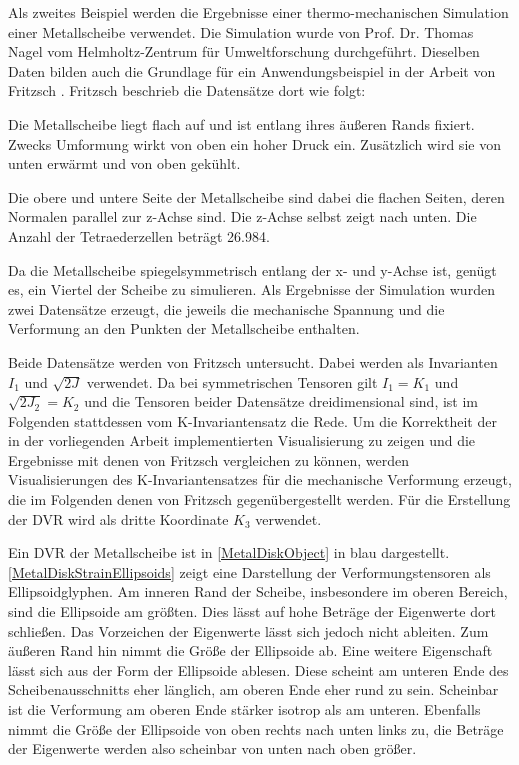 \documentclass[a4paper,fontsize=12pt,toc=bib,parskip=half,ngerman]{scrartcl}
\begin{document}
Als zweites Beispiel werden die Ergebnisse einer thermo-mechanischen Simulation einer Metallscheibe verwendet. Die Simulation wurde von Prof. Dr. Thomas Nagel vom Helmholtz-Zentrum f\"ur Umweltforschung durchgef\"uhrt. Dieselben Daten bilden auch die Grundlage f\"ur ein Anwendungsbeispiel in der Arbeit von Fritzsch \cite[S.15,~45~ ff.]{fritzsch2016continuousScatterplot}. Fritzsch beschrieb die Datens\"atze dort wie folgt:

\glqq Die Metallscheibe liegt flach auf und ist entlang ihres \"au{\ss}eren Rands fixiert. Zwecks Umformung wirkt von oben ein hoher Druck ein. Zus\"atzlich wird sie von unten erw\"armt und von oben gek\"uhlt.\grqq{}\cite[S.~15]{fritzsch2016continuousScatterplot}

Die \glq obere\grq{} und \glq untere\grq{} Seite der Metallscheibe sind dabei die flachen Seiten, deren Normalen parallel zur z-Achse sind. Die z-Achse selbst zeigt nach unten. Die Anzahl der Tetraederzellen betr\"agt 26.984.

Da die Metallscheibe spiegelsymmetrisch entlang der x- und y-Achse ist, gen\"ugt es, ein Viertel der Scheibe zu simulieren. Als Ergebnisse der Simulation wurden zwei Datens\"atze erzeugt, die jeweils die mechanische Spannung und die Verformung an den Punkten der Metallscheibe enthalten. 

Beide Datens\"atze werden von Fritzsch untersucht. Dabei werden als Invarianten $I_1$ und $\sqrt{2J}$ verwendet. Da bei symmetrischen Tensoren gilt $I_1 = K_1$ und $\sqrt{2J_2} = K_2$ und die Tensoren beider Datens\"atze dreidimensional sind, ist im Folgenden stattdessen vom K-Invariantensatz die Rede. Um die Korrektheit der in der vorliegenden Arbeit implementierten Visualisierung zu zeigen und die Ergebnisse mit denen von Fritzsch vergleichen zu k\"onnen, werden Visualisierungen des K-Invariantensatzes f\"ur die mechanische Verformung erzeugt, die im Folgenden denen von Fritzsch gegen\"ubergestellt werden. F\"ur die Erstellung der DVR wird als dritte Koordinate $K_3$ verwendet.

Ein DVR der Metallscheibe ist in \cref{MetalDiskObject} in blau dargestellt. \cref{MetalDiskStrainEllipsoids} zeigt eine Darstellung der Verformungstensoren als Ellipsoidglyphen. Am inneren Rand der Scheibe, insbesondere im oberen Bereich, sind die Ellipsoide am gr\"o{\ss}ten. Dies l\"asst auf hohe Betr\"age der Eigenwerte dort schlie{\ss}en. Das Vorzeichen der Eigenwerte l\"asst sich jedoch nicht ableiten. Zum \"au{\ss}eren Rand hin nimmt die Gr\"o{\ss}e der Ellipsoide ab. Eine weitere Eigenschaft l\"asst sich aus der Form der Ellipsoide ablesen. Diese scheint am unteren Ende des Scheibenausschnitts eher l\"anglich, am oberen Ende eher rund zu sein. Scheinbar ist die Verformung am oberen Ende st\"arker isotrop als am unteren. Ebenfalls nimmt die Gr\"o{\ss}e der Ellipsoide von oben rechts nach unten links zu, die Betr\"age der Eigenwerte werden also scheinbar von unten nach oben gr\"o{\ss}er.
\end{document}
